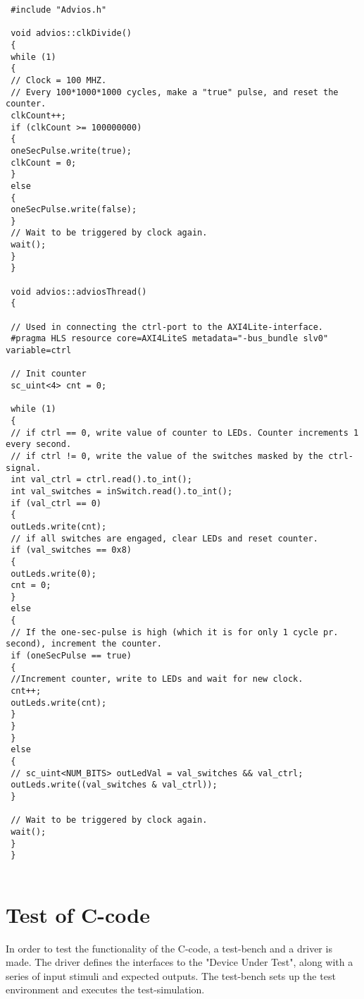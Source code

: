  \begin{lstlisting}
 #include "Advios.h"
 
 void advios::clkDivide()
 {
 while (1)
 {
 // Clock = 100 MHZ.
 // Every 100*1000*1000 cycles, make a "true" pulse, and reset the counter.
 clkCount++;
 if (clkCount >= 100000000)
 {
 oneSecPulse.write(true);
 clkCount = 0;
 }
 else
 {
 oneSecPulse.write(false);
 }
 // Wait to be triggered by clock again.
 wait();
 }
 }
 
 void advios::adviosThread()
 {
 
 // Used in connecting the ctrl-port to the AXI4Lite-interface.
 #pragma HLS resource core=AXI4LiteS metadata="-bus_bundle slv0" variable=ctrl
 
 // Init counter
 sc_uint<4> cnt = 0;
 
 while (1)
 {
 // if ctrl == 0, write value of counter to LEDs. Counter increments 1 every second.
 // if ctrl != 0, write the value of the switches masked by the ctrl-signal.
 int val_ctrl = ctrl.read().to_int();
 int val_switches = inSwitch.read().to_int();
 if (val_ctrl == 0)
 {
 outLeds.write(cnt);
 // if all switches are engaged, clear LEDs and reset counter.
 if (val_switches == 0x8)
 {
 outLeds.write(0);
 cnt = 0;
 }
 else
 {
 // If the one-sec-pulse is high (which it is for only 1 cycle pr. second), increment the counter.
 if (oneSecPulse == true)
 {
 //Increment counter, write to LEDs and wait for new clock.
 cnt++;
 outLeds.write(cnt);
 }
 }
 }
 else
 {
 //	sc_uint<NUM_BITS> outLedVal = val_switches && val_ctrl;
 outLeds.write((val_switches & val_ctrl));
 }
 
 // Wait to be triggered by clock again.
 wait();
 }
 }
 
\end{lstlisting}
\label{lst:advios_cpp}

\section{Test of C-code}
In order to test the functionality of the C-code, a test-bench and a driver is made.
The driver defines the interfaces to the "Device Under Test", along with a series of input stimuli and expected outputs. The test-bench sets up the test environment and executes the test-simulation.

